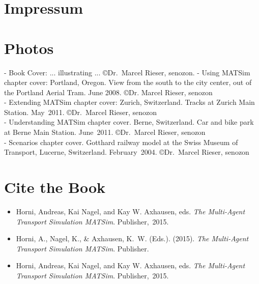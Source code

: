 \section*{Impressum}

\section*{Photos}

- Book Cover: ... illustrating ... \copyright Dr.~Marcel Rieser, \gls{senozon}.
- Using MATSim chapter cover: Portland, Oregon. View from the south to the city center, out of the Portland Aerial Tram. June 2008. \copyright Dr. Marcel Rieser, \gls{senozon}\\
- Extending MATSim chapter cover: Zurich, Switzerland. Tracks at Zurich Main Station. May~2011. \copyright Dr.~Marcel Rieser, \gls{senozon}\\
- Understanding MATSim chapter cover. Berne, Switzerland. Car and bike park at Berne Main Station. June~2011. \copyright Dr.~Marcel Rieser, \gls{senozon}\\
- Scenarios chapter cover. Gotthard railway model at the Swiss Museum of Transport, Lucerne, Switzerland. February~2004. \copyright Dr.~Marcel Rieser, \gls{senozon}\\

\section*{Cite the Book}
\begin{itemize}\styleItemize
\item {} Horni, Andreas, Kai Nagel, and Kay W. Axhausen, eds. \emph{The Multi-Agent Transport Simulation MATSim}. Publisher,~2015.
%
\item {} Horni, A., Nagel, K., \& Axhausen, K.~W. (Eds.). (2015). \emph{The Multi-Agent Transport Simulation MATSim}. Publisher.
%
\item {} Horni, Andreas, Kai Nagel, and Kay W. Axhausen, eds. \emph{The Multi-Agent Transport Simulation MATSim}. Publisher,~2015.
%
\end{itemize}

